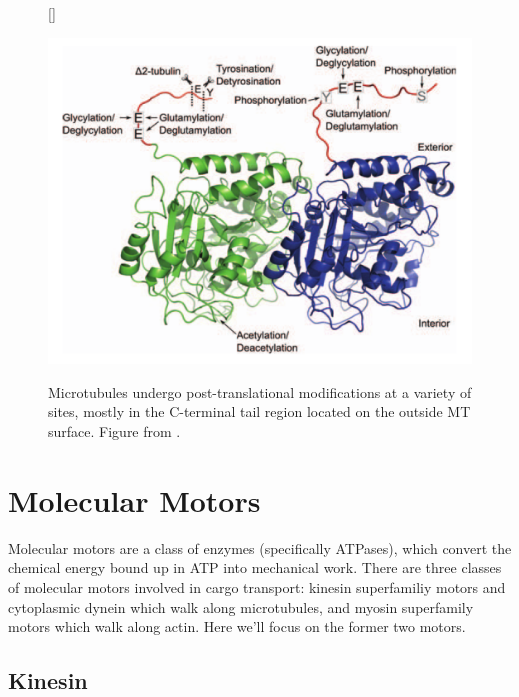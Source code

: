 \begin{figure}
[\FBwidth]
{\caption[Microtubule Post-translational Modification Sites]{Microtubules undergo post-translational modifications at a variety of sites, mostly in the C-terminal tail region located on the outside MT surface. Figure from \cite{Garnham2012}.}
\label{fig:PTMs}}
{\includegraphics[scale=.6]{background/PTMs}}
\end{figure}

\section{Molecular Motors}

Molecular motors are a class of enzymes (specifically ATPases), which convert the chemical energy bound up in ATP into mechanical work. There are three classes of molecular motors involved in cargo transport: kinesin superfamiliy motors and cytoplasmic dynein which walk along microtubules, and myosin superfamily motors which walk along actin. Here we'll focus on the former two motors.

\subsection{Kinesin} \label{sec:kinesin}

